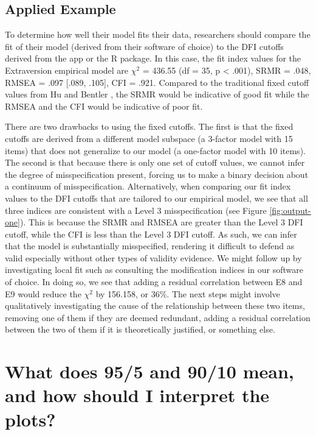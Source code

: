\documentclass[
]{book}
\begin{document}
\hypertarget{applied-example-1}{%
\section{Applied Example}\label{applied-example-1}}

To determine how well their model fits their data, researchers should compare the fit of their model (derived from their software of choice) to the DFI cutoffs derived from the app or the R package. In this case, the fit index values for the Extraversion empirical model are \({\chi}^2\) = 436.55 (df = 35, p \textless{} .001), SRMR = .048, RMSEA = .097 {[}.089, .105{]}, CFI = .921. Compared to the traditional fixed cutoff values from Hu and Bentler \citeyearpar{hu_cutoff_1999}, the SRMR would be indicative of good fit while the RMSEA and the CFI would be indicative of poor fit.

There are two drawbacks to using the fixed cutoffs. The first is that the fixed cutoffs are derived from a different model subspace (a 3-factor model with 15 items) that does not generalize to our model (a one-factor model with 10 items). The second is that because there is only one set of cutoff values, we cannot infer the degree of misspecification present, forcing us to make a binary decision about a continuum of misspecification. Alternatively, when comparing our fit index values to the DFI cutoffs that are tailored to our empirical model, we see that all three indices are consistent with a Level 3 misspecification (see Figure \ref{fig:output-one}). This is because the SRMR and RMSEA are greater than the Level 3 DFI cutoff, while the CFI is less than the Level 3 DFI cutoff. As such, we can infer that the model is substantially misspecified, rendering it difficult to defend as valid especially without other types of validity evidence. We might follow up by investigating local fit such as consulting the modification indices in our software of choice. In doing so, we see that adding a residual correlation between E8 and E9 would reduce the \({\chi}^2\) by 156.158, or 36\%. The next steps might involve qualitatively investigating the cause of the relationship between these two items, removing one of them if they are deemed redundant, adding a residual correlation between the two of them if it is theoretically justified, or something else.

\hypertarget{ninetyfive}{%
\chapter{What does 95/5 and 90/10 mean, and how should I interpret the plots?}\label{ninetyfive}}
\end{document}
